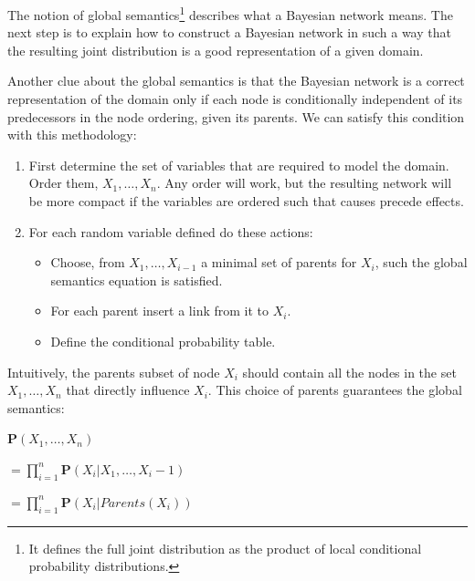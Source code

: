 The notion of global semantics\footnote{It defines the full joint distribution as the product of local conditional probability distributions.} describes what a Bayesian network means.
The next step is to explain how to construct a Bayesian network in such a way that the resulting joint distribution is a good representation of a given domain. \vspace{3.5pt}

Another clue about the global semantics is that the Bayesian network is a correct representation of the domain only if each node is conditionally independent
of its predecessors in the node ordering, given its parents. We can satisfy this condition with this methodology:
\begin{enumerate}
    \item First determine the set of variables that are required to model the domain. Order them, ${X_1, \dots, X_n}$. Any order will work, but the resulting network will be more compact if the variables are ordered such that causes precede effects.
    \item For each random variable defined do these actions:
    \begin{itemize}
        \renewcommand{\labelitemi}{-} 
        \item Choose, from $X_1, \dots, X_{i-1}$ a minimal set of parents for $X_i$, such the global semantics equation is satisfied.
        \item For each parent insert a link from it to $X_i$.
        \item Define the conditional probability table.
    \end{itemize}
\end{enumerate}
Intuitively, the parents subset of node $X_i$ should contain all the nodes in the set $X_1, \dots, X_n$ that directly influence $X_i$. This choice of parents guarantees the global
semantics:
\begin{center}
    $\mathbf{P}(X_1, \dots, X_n)$
    
    $ = \prod_{i=1}^{n} \mathbf{P}(X_i|X_1, \dots, X_i-1)$

    $= \prod_{i=1}^{n} \mathbf{P}(X_i|Parents(X_i))$
\end{center}
